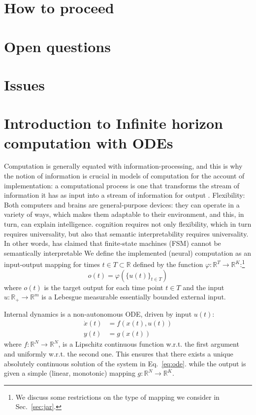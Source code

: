 \documentclass{scrartcl}
\theoremstyle{definition}
\theoremstyle{remark}
\newcommand{\reals}{\mathbb{R}}
\begin{document}
\section*{How to proceed}


\section*{Open questions}


\section*{Issues}



\newpage
\section{Introduction to Infinite horizon computation with ODEs}	
Computation is generally equated with information-processing, and this is why the notion of information is crucial in models of computation for the account of implementation: a computational process is one that transforms the stream of information it has as input into a stream of information for output \citep{milkowski2014}.
Flexibility: Both computers and brains are general‑purpose devices: they can operate in a variety of ways, which makes them adaptable to their environment, and this, in turn, can explain intelligence. \citep{milkowski2018computermetaphor}
cognition requires not only flexibility, which in turn requires universality, but also that semantic interpretability requires universality.
 In other words, \citep{pylyshyn1984} has claimed that finite‑state machines (FSM) cannot be semantically interpretable
We define the implemented (neural) computation as an input-output mapping for times $t\in T\subset\reals$ defined by the function $\varphi:\reals^T\rightarrow\reals^K$:\footnote{We discuss some restrictions on the type of mapping we consider in Sec.~\ref{sec:jar}.}
\begin{equation}
o(t) = \varphi(\{u(t)\}_{t\in T})
\end{equation}
where $o(t)$ is the target output for each time point $t\in T$ and the input  $u:\reals_{+}\to \reals^{m}$  is a Lebesgue measurable essentially bounded external input.

Internal dynamics is a non-autonomous ODE, driven by input $u(t)$:
\begin{align}
\dot x(t) &= f(x(t),u(t))\label{eq:ode}\\
y(t) &= g(x(t))	\label{eq:output}
\end{align}
where $f:\reals^N\rightarrow\reals^N$, is a Lipschitz continuous function w.r.t. the first argument and uniformly w.r.t. the second one. This ensures that there exists a unique absolutely continuous solution of the system in Eq.~\ref{eq:ode}.
while the output is given a simple (linear, monotonic) mapping $g:\reals^N\rightarrow\reals^K$.
\end{document}
